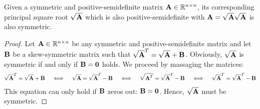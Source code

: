 		\begin{lemma}
			Given a symmetric and positive-semidefinite matrix \( \boldsymbol{\mathrm{A}} \in \mathbb{R}^{n \times n} \), its corresponding principal square root \( \sqrt{\boldsymbol{\mathrm{A}}} \) which is also positive-semidefinite with \( \boldsymbol{\mathrm{A}} = \sqrt{\boldsymbol{\mathrm{A}}} \sqrt{\boldsymbol{\mathrm{A}}} \) is also symmetric.
		\end{lemma}
		\begin{proof}
			Let \( \boldsymbol{\mathrm{A}} \in \mathbb{R}^{n \times n} \) be any symmetric and positive-semidefinite matrix and let \( \boldsymbol{\mathrm{B}} \) be a skew-symmetric matrix such that \( \sqrt{\boldsymbol{\mathrm{A}}}^T = \sqrt{\boldsymbol{\mathrm{A}}} + \boldsymbol{\mathrm{B}} \). Obviously, \( \sqrt{\boldsymbol{\mathrm{A}}} \) is symmetric if and only if \( \boldsymbol{\mathrm{B}} = \boldsymbol{\mathrm{0}} \) holds. We proceed by massaging the matrices:
			\begin{align*}
				\sqrt{\boldsymbol{\mathrm{A}}}^T = \sqrt{\boldsymbol{\mathrm{A}}} + \boldsymbol{\mathrm{B}}
					\quad\iff\quad \sqrt{\boldsymbol{\mathrm{A}}} = \sqrt{\boldsymbol{\mathrm{A}}}^T - \boldsymbol{\mathrm{B}}
					\quad\iff\quad \sqrt{\boldsymbol{\mathrm{A}}^T} = \sqrt{\boldsymbol{\mathrm{A}}}^T - \boldsymbol{\mathrm{B}}
					\quad\iff\quad \sqrt{\boldsymbol{\mathrm{A}}}^T = \sqrt{\boldsymbol{\mathrm{A}}}^T - \boldsymbol{\mathrm{B}}
			\end{align*}
			This equation can only hold if \(\boldsymbol{\mathrm{B}}\) zeros out: \( \boldsymbol{\mathrm{B}} = \boldsymbol{\mathrm{0}} \). Hence, \( \sqrt{\boldsymbol{\mathrm{A}}} \) must be symmetric.
		\end{proof}

